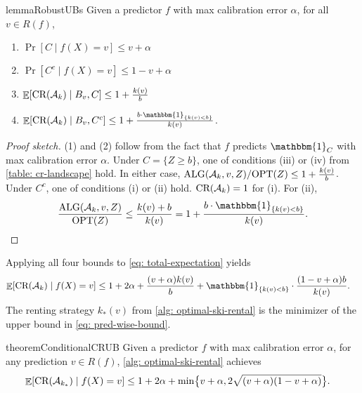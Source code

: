 \begin{restatable}{lemma}{RobustUBs} \label{lemma: robust-ubs}
    Given a predictor $f$ with max calibration error $\alpha$, for all $v \in R(f)$,
    \begin{enumerate}\vspace{-2mm}
        \item $\Pr[C \mid f(X) = v] \leq v +\alpha$
        \item  $\Pr[C^c \mid f(X) = v] \leq 1-v+\alpha$
        \item  $\mathop{\mathbb{E}}[\textnormal{CR}(\mathcal{A}_k) \mid B_v, C] \leq 1 + \frac{k(v)}{b}$
        \item  $\E[\CR(\cA_k) \mid B_v, C^c] \leq 1 + \frac{b \cdot \mathbbm{1}_{\{k(v)<b\}}}{k(v)}$.
    \end{enumerate}
\end{restatable}
\begin{proof}[Proof sketch]
(1) and (2) follow from the fact that $f$ predicts $\mathbbm{1}_C$ with max calibration error $\alpha$. Under $C=\{Z \geq b\}$, one of conditions (iii) or (iv) from \cref{table: cr-landscape} hold. In either case, $\textnormal{ALG}(\mathcal{A}_k, v, Z)/\textnormal{OPT}(Z) \leq 1 + \frac{k(v)}{b}$. Under $C^c$, one of conditions (i) or (ii) hold. $\textnormal{CR}(\mathcal{A}_k) = 1$ for (i). For (ii),
    \[\frac{\ALG(\cA_k, v, Z)}{\OPT(Z)} \leq \frac{k(v) + b}{k(v)} = 1 + \frac{b \cdot \mathbbm{1}_{\{k(v)<b\}}}{k(v)}.\]
\end{proof}
Applying all four bounds to \cref{eq: total-expectation} yields
\begin{align} \label{eq: pred-wise-bound}
    \E[\CR(\cA_k) \mid f(X) = v] \leq
         1+2\alpha +\frac{(v+\alpha)k(v)}{b}& + \mathbbm{1}_{\{k(v)<b\}} \cdot \frac{(1-v+\alpha)b}{k(v)}.
\end{align}
The renting strategy $k_*(v)$ from \cref{alg: optimal-ski-rental} is the minimizer of the upper bound in \cref{eq: pred-wise-bound}.
\begin{restatable}{theorem}{ConditionalCRUB} \label{thm: conditional-cr-ub}
    Given a predictor $f$ with max calibration error $\alpha$, for any prediction $v \in R(f)$, \cref{alg: optimal-ski-rental} achieves
    \begin{align*}
        \mathop{\mathbb{E}}[\textnormal{CR}(\mathcal{A}_{k_*}) \mid f(X)=v] \leq  1+2\alpha +\min\bigl\{v+\alpha&, 2\sqrt{(v+\alpha)(1-v+\alpha)} \bigr\}.
    \end{align*}
\end{restatable}


